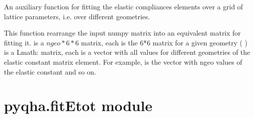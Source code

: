 \documentclass[letterpaper,10pt,english]{sphinxmanual}
\begin{document}

\begin{fulllineitems}
An auxiliary function for fitting the elastic compliances elements over a
grid of lattice parameters, i.e. over different geometries.

\end{fulllineitems}


\begin{fulllineitems}
This function rearrange the input numpy matrix  into an equivalent matrix 
for fitting it.
 is a \(ngeo*6*6\) matrix, each  is the 6*6  matrix for a given geometry (  )
 is a Lmath: matrix, each  is a vector with all values for different
geometries of the  elastic constant matrix element. For example, 
is the vector with ngeo values of the  elastic constant and so on.

\end{fulllineitems}



\section{pyqha.fitEtot module}
\label{pyqha:pyqha-fitetot-module}\label{pyqha:module-pyqha.fitEtot}
\end{document}
